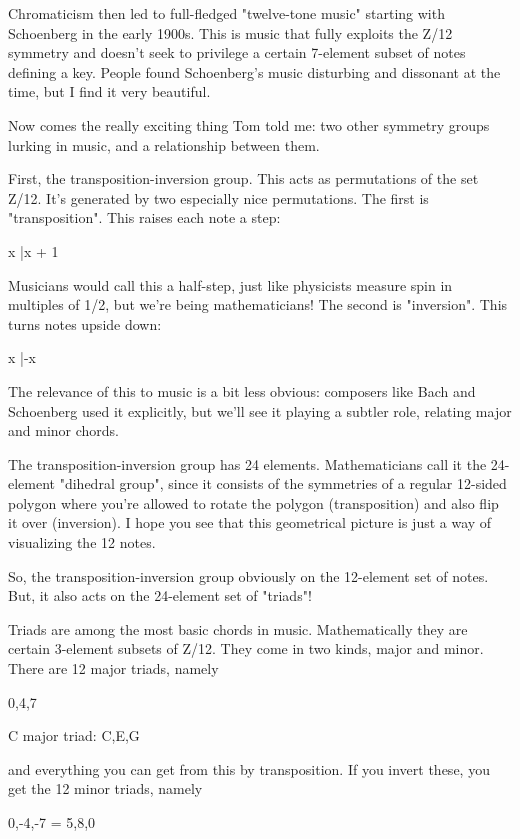 Chromaticism then led to full-fledged "twelve-tone music" 
starting with Schoenberg in the early 1900s.  This is music 
that fully exploits the Z/12 symmetry and doesn't seek to 
privilege a certain 7-element subset of notes defining a key.  
People found Schoenberg's music disturbing and dissonant at 
the time, but I find it very beautiful.  

Now comes the really exciting thing Tom told me: two other 
symmetry groups lurking in music, and a relationship between them.

First, the transposition-inversion group.  This acts as
permutations of the set Z/12.  It's generated by two 
especially nice permutations.  The first is "transposition".
This raises each note a step:
 
x |\to  x + 1 

Musicians would call this a half-step, just like physicists
measure spin in multiples of 1/2, but we're being mathematicians!
The second is "inversion".  This turns notes upside down:

x |\to  -x

The relevance of this to music is a bit less obvious: composers
like Bach and Schoenberg used it explicitly, but we'll see it
playing a subtler role, relating major and minor chords.

The transposition-inversion group has 24 elements.  Mathematicians 
call it the 24-element "dihedral group", since it consists of the 
symmetries of a regular 12-sided polygon where you're allowed 
to rotate the polygon (transposition) and also flip it over 
(inversion).  I hope you see that this geometrical picture is 
just a way of visualizing the 12 notes.

So, the transposition-inversion group obviously on the 12-element
set of notes.  But, it also acts on the 24-element set of "triads"!  

Triads are among the most basic chords in music.  Mathematically 
they are certain 3-element subsets of Z/12.   They come in two 
kinds, major and minor.  There are 12 major triads, namely 

{0,4,7}   
                  
                  
                  
   
     C major triad: {C,E,G}

and everything you can get from this by transposition.  If you 
invert these, you get the 12 minor triads, namely

{0,-4,-7} = {5,8,0}                   
                  
